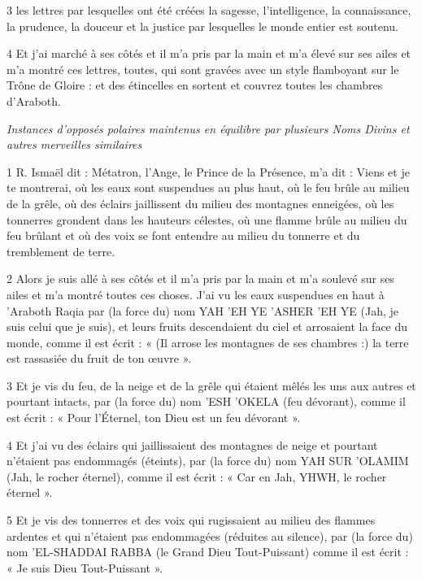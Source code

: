 \par 3 les lettres par lesquelles ont été créées la sagesse, l'intelligence, la connaissance, la prudence, la douceur et la justice par lesquelles le monde entier est soutenu.

\par 4 Et j'ai marché à ses côtés et il m'a pris par la main et m'a élevé sur ses ailes et m'a montré ces lettres, toutes, qui sont gravées avec un style flamboyant sur le Trône de Gloire : et des étincelles en sortent et couvrez toutes les chambres d'Araboth.



\par \textit{Instances d'opposés polaires maintenus en équilibre par plusieurs Noms Divins et autres merveilles similaires}

\par 1 R. Ismaël dit : Métatron, l'Ange, le Prince de la Présence, m'a dit : Viens et je te montrerai, où les eaux sont suspendues au plus haut, où le feu brûle au milieu de la grêle, où des éclairs jaillissent du milieu des montagnes enneigées, où les tonnerres grondent dans les hauteurs célestes, où une flamme brûle au milieu du feu brûlant et où des voix se font entendre au milieu du tonnerre et du tremblement de terre.

\par 2 Alors je suis allé à ses côtés et il m'a pris par la main et m'a soulevé sur ses ailes et m'a montré toutes ces choses. J'ai vu les eaux suspendues en haut à 'Araboth Raqia par (la force du) nom YAH 'EH YE 'ASHER 'EH YE (Jah, je suis celui que je suis), et leurs fruits descendaient du ciel et arrosaient la face du monde, comme il est écrit : « (Il arrose les montagnes de ses chambres :) la terre est rassasiée du fruit de ton œuvre ».

\par 3 Et je vis du feu, de la neige et de la grêle qui étaient mêlés les uns aux autres et pourtant intacts, par (la force du) nom 'ESH 'OKELA (feu dévorant), comme il est écrit : « Pour l'Éternel, ton Dieu est un feu dévorant ».

\par 4 Et j'ai vu des éclairs qui jaillissaient des montagnes de neige et pourtant n'étaient pas endommagés (éteints), par (la force du) nom YAH SUR 'OLAMIM (Jah, le rocher éternel), comme il est écrit : « Car en Jah, YHWH, le rocher éternel ».

\par 5 Et je vis des tonnerres et des voix qui rugissaient au milieu des flammes ardentes et qui n'étaient pas endommagées (réduites au silence), par (la force du) nom 'EL-SHADDAI RABBA (le Grand Dieu Tout-Puissant) comme il est écrit : « Je suis Dieu Tout-Puissant ».

